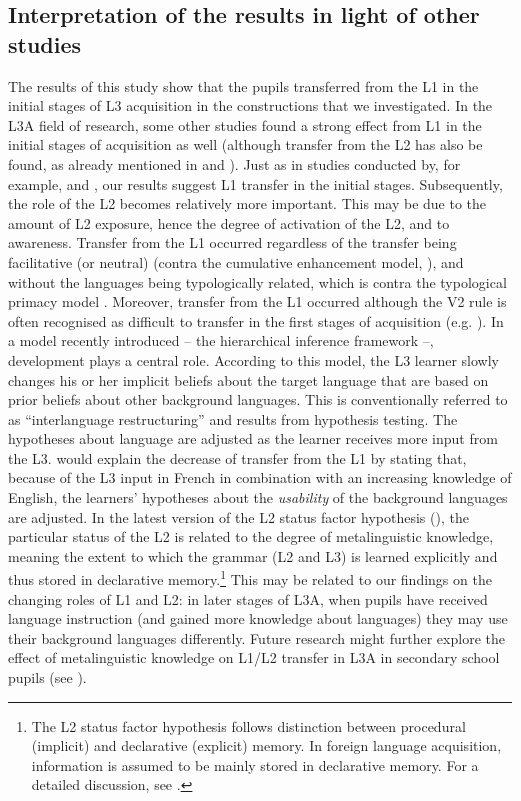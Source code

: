 \documentclass[output=paper]{langsci/langscibook}
\begin{document}
\subsection{Interpretation of the results in light of other studies}%
\label{sec:stadt:5.2}
The results of this study show that the pupils transferred from the L1 in the initial stages of L3 acquisition in the constructions that we investigated. In the L3A field of research, some other studies found a strong effect from L1 in the initial stages of acquisition as well (although transfer from the L2 has also be found, as already mentioned in  and ). Just as in studies conducted by, for example, \citet{NaRanongLeung2009} and \citet{Hermas2010, Hermas2014Morphosyntax, Hermas2014Relatives}, our results suggest L1 transfer in the initial stages. Subsequently, the role of the L2 becomes relatively more important. This may be due to the amount of L2 exposure, hence the degree of activation of the L2, and to awareness.
Transfer from the L1 occurred regardless of the transfer being facilitative (or neutral) (contra the cumulative enhancement model, \citealt{FlynnEtAl2004}), and without the languages being typologically related, which is contra the typological primacy model \citep{Rothman2010, Rothman2011, Rothman2015}. Moreover, transfer from the L1 occurred although the V2 rule is often recognised as difficult to transfer in the first stages of acquisition (e.g. \citealt{Pienemann1998}). In a model recently introduced – the hierarchical inference framework \citep{PajakEtAl2016} –, development plays a central role. According to this model, the L3 learner slowly changes his or her implicit beliefs about the target language that are based on prior beliefs about other background languages. This is conventionally referred to as ``interlanguage restructuring'' and results from hypothesis testing. The hypotheses about language are adjusted as the learner receives more input from the L3. \citet{PajakEtAl2016} would explain the decrease of transfer from the L1 by stating that, because of the L3 input in French in combination with an increasing knowledge of English, the learners’ hypotheses about the \textit{usability} of the background languages are adjusted.
In the latest version of the L2 status factor hypothesis (\citealt{BardelSánchez2017}), the particular status of the L2 is related to the degree of metalinguistic knowledge, meaning the extent to which the grammar (L2 and L3) is learned explicitly and thus stored in declarative memory.\footnote{The L2 status factor hypothesis follows  distinction between procedural (implicit) and declarative (explicit) memory. In foreign language acquisition, information is assumed to be mainly stored in declarative memory. For a detailed discussion, see \citet{BardelSánchez2017}.} This may be related to our findings on the changing roles of L1 and L2: in later stages of L3A, when pupils have received language instruction (and gained more knowledge about languages) they may use their background languages differently. Future research might further explore the effect of metalinguistic knowledge on L1/L2 transfer in L3A in secondary school pupils (see \citealt{FalkEtAl2015}).
\end{document}
